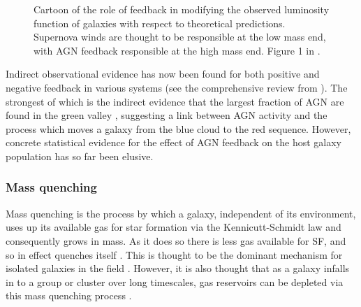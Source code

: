 \begin{figure}[t]
\caption[Illustration of the mismatch between theoretical and observed luminosity function from Silk \& Mamon (2012)]{Cartoon of the role of feedback in modifying the observed luminosity function of galaxies with respect to theoretical predictions. Supernova winds are thought to be responsible at the low mass end, with AGN feedback responsible at the high mass end. Figure 1 in \cite{silk12}.}
\label{fig:lumfuncpic}
\end{figure}

Indirect observational evidence has now been found for both positive and negative feedback in various systems (see the comprehensive review from \citealt{fabian12}). The strongest of which is the indirect evidence that the largest fraction of AGN are found in the green valley \citep{cowie08, Hickox09, schawinski10a}, suggesting a link between AGN activity and the process which moves a galaxy from the blue cloud to the red sequence. However, concrete statistical evidence for the effect of AGN feedback on the host galaxy population has so far been elusive.


\subsubsection{Mass quenching}\label{sec:massquench}
Mass quenching is the process by which a galaxy, independent of its environment, uses up its available gas for star formation via the Kennicutt-Schmidt law \citep{schmidt59, kennicutt98} and consequently grows in mass. As it does so there is less gas available for SF, and so in effect quenches itself \citep{peng12}. This is thought to be the dominant mechanism for isolated galaxies in the field \citep{kormendy04}. However, it is also thought that as a galaxy infalls in to a group or cluster over long timescales, gas reservoirs can be depleted via this mass quenching process \citep{peng12}.
 
